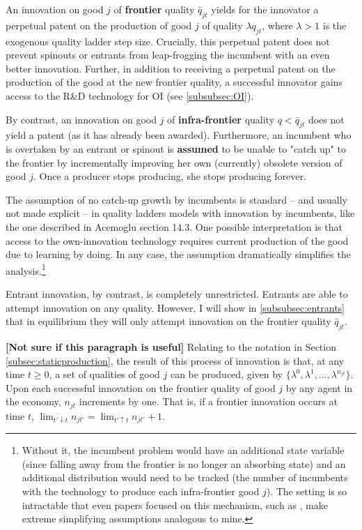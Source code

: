 \documentclass[11pt,english]{article}
\theoremstyle{remark}
\begin{document}
An innovation on good $j$ of \textbf{frontier} quality $\bar{q}_{jt}$ yields for the innovator a perpetual patent on the production of good $j$ of quality $\lambda q_{jt}$, where $\lambda > 1$ is the exogenous quality ladder step size. Crucially, this perpetual patent does not prevent spinouts or entrants from leap-frogging the incumbent with an even better innovation. Further, in addition to receiving a perpetual patent on the production of the good at the new frontier quality, a successful innovator gains access to the R\&D technology for OI (see \ref{subsubsec:OI}).

By contrast, an innovation on good $j$ of \textbf{infra-frontier} quality $q < \bar{q}_{jt}$ does not yield a patent (as it has already been awarded). Furthermore, an incumbent who is overtaken by an entrant or spinout is \textbf{assumed} to be unable to "catch up" to the frontier by incrementally improving her own (currently) obsolete version of good $j$. Once a producer stops producing, she stops producing forever. 

The assumption of no catch-up growth by incumbents is standard -- and usually not made explicit -- in quality ladders models with innovation by incumbents, like the one described in Acemoglu section 14.3. One possible interpretation is that access to the own-innovation technology requires current production of the good due to learning by doing. In any case, the assumption dramatically simplifies the analysis.\footnote{Without it, the incumbent problem would have an additional state variable (since falling away from the frontier is no longer an absorbing state) and an additional distribution would need to be tracked (the number of incumbents with the technology to produce each infra-frontier good $j$). The setting is so intractable that even papers focused on this mechanism, such as \cite{aghion_competition_2005}, make extreme simplifying assumptions analogous to mine.} 

Entrant innovation, by contrast, is completely unrestricted. Entrants are able to attempt innovation on any quality. However, I will show in \ref{subsubsec:entrants} that in equilibrium they will only attempt innovation on the frontier quality $\bar{q}_{jt}$. 

\textbf{[Not sure if this paragraph is useful]} Relating to the notation in Section \ref{subsec:staticproduction}, the result of this process of innovation is that, at any time $t \ge 0$, a set of qualities of good $j$ can be produced, given by $\{\lambda^0, \lambda^1, \ldots, \lambda^{n_{jt}}\}$. Upon each successful innovation on the frontier quality of good $j$ by any agent in the economy, $n_{jt}$ increments by one. That is, if a frontier innovation occurs at time $t$, $\lim_{t' \downarrow t} n_{jt'} = \lim_{t' \uparrow t} n_{jt'} + 1$.
\end{document}
